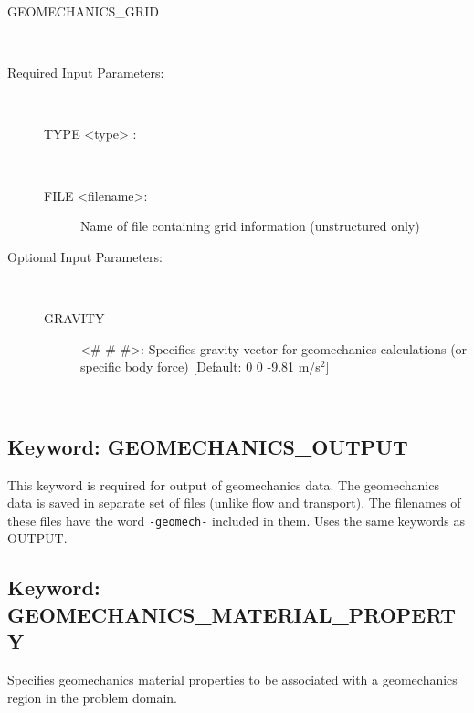 \begin{description}
\item[GEOMECHANICS\_GRID]~
\item[Required Input Parameters:]~

\begin{description}
\item[TYPE <type> :] ~


\item[FILE <filename>:] Name of file containing grid information (unstructured only)

\end{description}

\item[Optional Input Parameters:]~
\begin{description}
\item[GRAVITY] <\# \# \#>: Specifies gravity vector for geomechanics calculations (or specific body force) [Default: 0 0 -9.81 m/s$^2$] 
\end{description}


\item[\keyend] ~

\end{description}

\newpage
\protect\hypertarget{target_geomech_output}{}
 
\subsection{Keyword: GEOMECHANICS\_OUTPUT}

 This keyword is required for output of geomechanics data. The geomechanics data is saved in separate set of files (unlike flow and transport). The filenames of these files have the word \texttt{-geomech-} included in them.  Uses the same keywords as OUTPUT. 

\newpage
\protect\hypertarget{target_geomech_material_prop}{}
 
\subsection{Keyword: GEOMECHANICS\_MATERIAL\_PROPERTY}
 Specifies geomechanics material properties to be associated with a geomechanics region in the problem domain.


